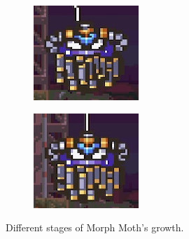 \begin{figure}[htp]
\begin{subfigure}{0.3\linewidth}
	\end{subfigure}
	\begin{subfigure}{0.3\linewidth}
		\centering
		\includegraphics[width=\linewidth]{figures/X2/Morph_moth/Moth_5.jpg}	
	\end{subfigure}
	\begin{subfigure}{0.3\linewidth}
		\centering
		\includegraphics[width=\linewidth]{figures/X2/Morph_moth/Moth_6.jpg}
	\end{subfigure}
	\caption{Different stages of Morph Moth's growth.}
\end{figure}

